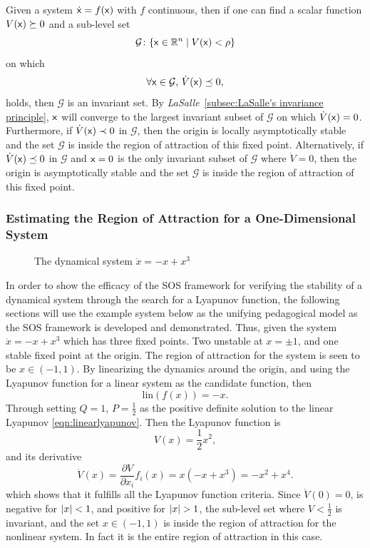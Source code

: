 \begin{theorem}
  Given a system \(\dot{{\mathbf{\mathsf{x}}}} = f({\mathbf{\mathsf{x}}})\) with \(f\) continuous, then if
  one can find a scalar function \(V({\mathbf{\mathsf{x}}}) \succeq 0 \) and a sub-level set
  \[
    \mathcal{G} \colon \lbrace{\mathbf{\mathsf{x}}} \in \mathbb{R}^n \mid V({\mathbf{\mathsf{x}}}) < \rho\rbrace
  \]
  on which
  \[
    \forall {\mathbf{\mathsf{x}}} \in \mathcal{G},\,\dot{V}({\mathbf{\mathsf{x}}}) \preceq 0,
  \]
  holds, then \(\mathcal{G}\) is an invariant set. By
  \textit{LaSalle}~\ref{subsec:LaSalle's invariance principle}, \({\mathbf{\mathsf{x}}}\)
  will converge to the largest invariant subset of \(\mathcal{G}\) on which
  \(\dot{V}({\mathbf{\mathsf{x}}}) = 0\). Furthermore, if \(\dot{V}({\mathbf{\mathsf{x}}}) \prec 0\) in
  \(\mathcal{G}\), then the origin is locally asymptotically stable and the set
  \(\mathcal{G}\) is inside the region of attraction of this fixed point.
  Alternatively, if \(\dot{V}({\mathbf{\mathsf{x}}}) \preceq 0 \) in \(\mathcal{G}\) and
  \({\mathbf{\mathsf{x}}} = 0\) is the only invariant subset of \(\mathcal{G}\) where
  \(\dot{V} = 0\), then the origin is asymptotically stable and the set
  \(\mathcal{G}\) is inside the region of attraction of this fixed point.
\end{theorem}

\subsubsection{Estimating the Region of Attraction for a One-Dimensional System}
\label{subsec:Estimating the region of attraction for a one-dimensional system}

\begin{figure}
  \centering 
  \caption[A visualization of the dynamical system \(\dot{x} = -x + x^3\)]{The
    dynamical system \(\dot{x} = -x + x^3\)}
\end{figure}

In order to show the efficacy of the \ac{SOS} framework for verifying the
stability of a dynamical system through the search for a Lyapunov function, the
following sections will use the example system below as the unifying pedagogical
model as the \ac{SOS} framework is developed and demonstrated. Thus, given the
system \(\dot{x} = -x + x^3\) which has three fixed points. Two unstable at \(x
= \pm 1\), and one stable fixed point at the origin. The region of attraction
for the system is seen to be \(x \in \left( -1, 1 \right)\). By linearizing the
dynamics around the origin, and using the Lyapunov function for a linear system
as the candidate function, then
\[
  \text{lin}(f(x)) = -x.
\]
Through setting \(Q=1\), \(P=\frac{1}{2}\) as the positive definite solution to
the linear Lyapunov \cref{eqn:linearlyapunov}. Then the Lyapunov function is
\[
  V(x) = \frac{1}{2}x^2,
\]
and its derivative
\[
  \dot{V}(x) = \frac{\partial V}{\partial x_i} f_i(x) = x(-x + x^3) = -x^2 +
  x^4.
\]
which shows that it fulfills all the Lyapunov function criteria. Since
\(\dot{V}(0) = 0\), is negative for \(\lvert x\rvert<1\), and positive for \(\lvert x\rvert >
1\), the sub-level set where \(V < \frac{1}{2}\) is invariant, and the set \(x
\in \left( -1, 1 \right)\) is inside the region of attraction for the nonlinear
system. In fact it is the entire region of attraction in this case.

